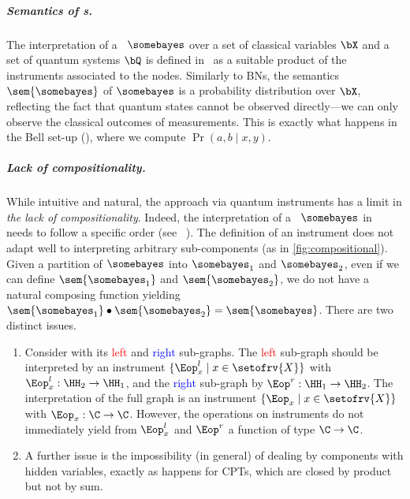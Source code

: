 
\subparagraph{Semantics of \QBN s.} 

The interpretation of a \QBN\ $\somebayes$ over a set of classical variables $\bX$ and a set of quantum systems $\bQ$ is defined in~\cite{GBN2014} as a suitable product of the instruments associated to the nodes.
Similarly to BNs, the semantics $\sem{\somebayes}$ of $\somebayes$ is a probability distribution over $\bX$, reflecting the fact that quantum states cannot be observed directly---we can only observe the classical outcomes of measurements.
This is exactly what happens in the Bell set-up (), where we compute $\Pr(a,b\mid x,y)$. 

\subparagraph{Lack of compositionality.}
\label{sec:lack}

While intuitive and natural, the approach via quantum instruments has a limit in \emph{the lack of compositionality}.
Indeed, the interpretation of a \QBN\ $\somebayes$ in~\cite{GBN2014} needs to follow a specific order (see ~\cite[page~12]{GBN2014}).
The definition of an instrument does not adapt well to interpreting arbitrary sub-components (as in \cref{fig:compositional}).
Given a partition of $\somebayes$ into $\somebayes_1$ and $\somebayes_2$, even if we can define $\sem{\somebayes_1}$ and $\sem{\somebayes_2}$, we do not have a natural composing function yielding $\sem{\somebayes_1} \bullet \sem{\somebayes_2}=\sem{\somebayes}$.
There are two distinct issues.
\begin{enumerate}
\item
Consider  with its \textcolor{red}{left} and \textcolor{blue}{right} sub-graphs.
The \textcolor{red}{left} sub-graph should be interpreted by an instrument $\{\Eop^l_x \mid x \in\setofrv{X}\}$ with $\Eop^l_x : \HH_2\to \HH_1$, and the \textcolor{blue}{right} sub-graph by $\Eop^r : \HH_1\to \HH_2$.
The interpretation of the full graph is an instrument $\{\Eop_x \mid x \in\setofrv{X}\}$ with $\Eop_x:\C\to\C$. 
However, the operations on instruments do not immediately yield from $\Eop^l_x$ and $\Eop^r$ a function of type $\C\to\C$.
\item
A further issue is the impossibility (in general) of dealing by components with hidden variables, exactly as happens for CPTs, which are closed by product but not by sum.
\end{enumerate}

